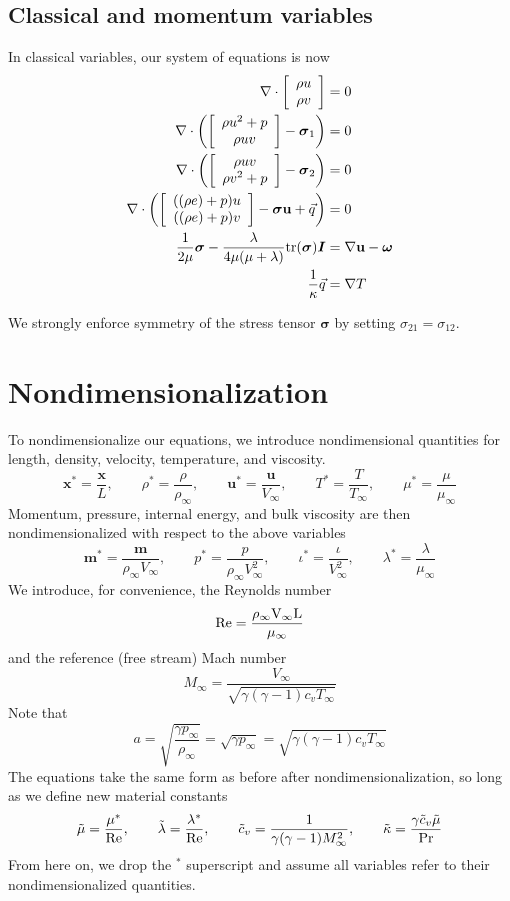 \documentclass{article}
\newcommand{\grad}{\nabla}
\renewcommand{\div}{\grad \cdot}
\newcommand{\Reyn}{\rm Re}
\def\vecttwo#1#2{\left[
\begin{array}{c}
#1\\
#2\\
\end{array}
\right]}
\begin{document}
\subsection{Classical and momentum variables}

In classical variables, our system of equations is now
\begin{align*}
\div \vecttwo{\rho u }{\rho v} &= 0\\
\div \left(\vecttwo{\rho u^2+p }{\rho u v} - \boldsymbol \sigma_{1}\right) &=0\\
\div \left(\vecttwo{\rho u v}{\rho v^2+p } - \boldsymbol \sigma_{2}\right) &=0\\
\div \left(\vecttwo{((\rho e)+p)u}{((\rho e)+p)v} - \boldsymbol\sigma \mathbf{u} + \vec{q}\right) &=0\\
\frac{1}{2\mu} \boldsymbol \sigma - \frac{\lambda}{4\mu (\mu + \lambda)} { \rm tr}(\boldsymbol \sigma) \boldsymbol I &= \grad \mathbf{u} - \boldsymbol \omega\\
\frac{1}{\kappa}\vec{q} &= \grad T
\end{align*}

We strongly enforce symmetry of the stress tensor $\boldsymbol \sigma$ by setting $\sigma_{21} = \sigma_{12}$. 

\section{Nondimensionalization}
To nondimensionalize our equations, we introduce nondimensional quantities for length, density, velocity, temperature, and viscosity. 
\[
\boldsymbol x^* = \frac{\boldsymbol x}{L}, \qquad \rho^* = \frac{\rho}{\rho_{\infty}}, \qquad \boldsymbol u^* = \frac{\boldsymbol u}{V_\infty}, \qquad T^* = \frac{T}{T_\infty}, \qquad \mu^* = \frac{\mu}{\mu_\infty}
\]
Momentum, pressure, internal energy, and bulk viscosity are then nondimensionalized with respect to the above variables
\[
\boldsymbol m^* = \frac{\boldsymbol m}{\rho_\infty V_\infty}, \qquad p^* = \frac{p}{\rho_\infty V_\infty^2}, \qquad \iota^* = \frac{\iota}{V_\infty^2}, \qquad \lambda^* = \frac{\lambda}{\mu_\infty}
\]
We introduce, for convenience, the Reynolds number
\[
\Reyn = \frac{\rho_\infty V_\infty L}{\mu_\infty} 
\]
and the reference (free stream) Mach number
\[
M_\infty = \frac{V_\infty}{\sqrt{\gamma(\gamma-1)c_vT_\infty}}
\]
Note that 
\[
a = \sqrt{\frac{\gamma p_\infty}{\rho_\infty}} = \sqrt{{\gamma p_\infty}} = \sqrt{\gamma(\gamma-1)c_vT_\infty}
\]
The equations take the same form as before after nondimensionalization, so long as we define new material constants
\[
\tilde{\mu} = \frac{\mu^*}{\Reyn}, \qquad \tilde{\lambda} = \frac{\lambda^*}{\Reyn}, \qquad \tilde{c}_v = \frac{1}{\gamma(\gamma-1)M_\infty^2}, \qquad \tilde{\kappa} = \frac{\gamma\tilde{c}_v\tilde{\mu}}{\rm Pr}
\]
From here on, we drop the $^*$ superscript and assume all variables refer to their nondimensionalized quantities.
\end{document}
